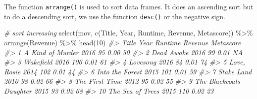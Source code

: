 \documentclass[
]{book}
\newenvironment{Shaded}{\begin{snugshade}}{\end{snugshade}}
\newcommand{\CommentTok}[1]{\textcolor[rgb]{0.56,0.35,0.01}{\textit{#1}}}
\newcommand{\DecValTok}[1]{\textcolor[rgb]{0.00,0.00,0.81}{#1}}
\newcommand{\FunctionTok}[1]{\textcolor[rgb]{0.00,0.00,0.00}{#1}}
\newcommand{\NormalTok}[1]{#1}
\newcommand{\SpecialCharTok}[1]{\textcolor[rgb]{0.00,0.00,0.00}{#1}}
\begin{document}
The function \texttt{arrange()} is used to sort data frames. It does an ascending sort but to do a descending sort, we use the function \texttt{desc()} or the negative sign.

\begin{Shaded}
\begin{Highlighting}[]
\CommentTok{\# sort increasing}
\FunctionTok{select}\NormalTok{(mov, }\FunctionTok{c}\NormalTok{(Title, Year, Runtime, Revenue, Metascore)) }\SpecialCharTok{\%\textgreater{}\%}
  \FunctionTok{arrange}\NormalTok{(Revenue) }\SpecialCharTok{\%\textgreater{}\%}
  \FunctionTok{head}\NormalTok{(}\DecValTok{10}\NormalTok{)}
\CommentTok{\#\textgreater{}                       Title Year Runtime Revenue Metascore}
\CommentTok{\#\textgreater{} 1          A Kind of Murder 2016      95    0.00        50}
\CommentTok{\#\textgreater{} 2                Dead Awake 2016      99    0.01        NA}
\CommentTok{\#\textgreater{} 3                 Wakefield 2016     106    0.01        61}
\CommentTok{\#\textgreater{} 4                  Lovesong 2016      84    0.01        74}
\CommentTok{\#\textgreater{} 5               Love, Rosie 2014     102    0.01        44}
\CommentTok{\#\textgreater{} 6           Into the Forest 2015     101    0.01        59}
\CommentTok{\#\textgreater{} 7                Stake Land 2010      98    0.02        66}
\CommentTok{\#\textgreater{} 8            The First Time 2012      95    0.02        55}
\CommentTok{\#\textgreater{} 9  The Blackcoat\textquotesingle{}s Daughter 2015      93    0.02        68}
\CommentTok{\#\textgreater{} 10         The Sea of Trees 2015     110    0.02        23}


\end{Highlighting}
\end{Shaded}
\end{document}
